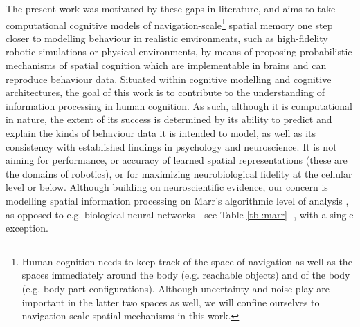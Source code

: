 The present work was motivated by these gaps in literature, and aims to take computational cognitive models of navigation-scale\footnote{Human cognition needs to keep track of the space of navigation as well as the spaces immediately around the body (e.g. reachable objects) and of the body (e.g. body-part configurations). Although uncertainty and noise play are important in the latter two spaces as well, we will confine ourselves to navigation-scale spatial mechanisms in this work.} spatial memory one step closer to modelling behaviour in realistic environments, such as high-fidelity robotic simulations or physical environments, by means of proposing probabilistic mechanisms of spatial cognition which are implementable in brains and can reproduce behaviour data. Situated within cognitive modelling and cognitive architectures, the goal of this work is to contribute to the understanding of information processing in human cognition. As such, although it is computational in nature, the extent of its success is determined by its ability to predict and explain the kinds of behaviour data it is intended to model, as well as its consistency with established findings in psychology and neuroscience. It is not aiming for performance, or accuracy of learned spatial representations (these are the domains of robotics), or for maximizing neurobiological fidelity at the cellular level or below. Although building on neuroscientific evidence, our concern is modelling spatial information processing on Marr's algorithmic level of analysis \citep{marr1976understanding, marr1977understanding}, as opposed to e.g. biological neural networks - see Table \ref{tbl:marr} -, with a single exception. 

